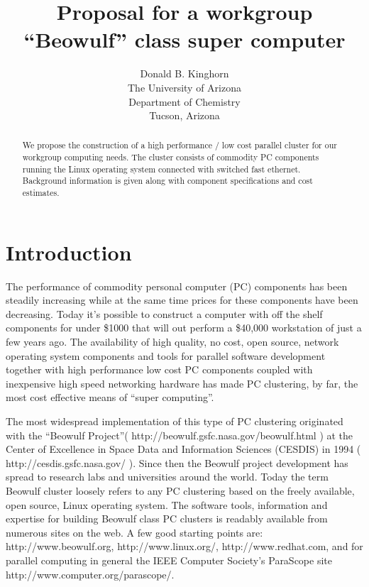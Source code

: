 \documentclass{article}
\begin{document}
\title{Proposal for a workgroup ``Beowulf'' class super computer}
\author{Donald B. Kinghorn\\The University of Arizona\\Department of Chemistry \\Tucson, Arizona}
\maketitle
\begin{abstract}
We propose the construction of a high performance / low cost parallel cluster
for our workgroup computing needs. The cluster consists of commodity PC
components running the Linux operating system connected with switched fast
ethernet. Background information is given along with component specifications
and cost estimates.
\end{abstract}



\section{Introduction}

The performance of commodity personal computer (PC) components has been
steadily increasing while at the same time prices for these components have
been decreasing. Today it's possible to construct a computer with off the
shelf components for under \$1000 that will out perform a \$40,000 workstation
of just a few years ago. The availability of high quality, no cost, open
source, network operating system components and tools for parallel software
development together with high performance low cost PC components coupled with
inexpensive high speed networking hardware has made PC clustering, by far, the
most cost effective means of ``super computing''.

The most widespread implementation of this type of PC clustering originated
with the ``Beowulf Project''( http://beowulf.gsfc.nasa.gov/beowulf.html ) at
the Center of Excellence in Space Data and Information Sciences (CESDIS) in
1994 ( http://cesdis.gsfc.nasa.gov/ ). Since then the Beowulf project
development has spread to research labs and universities around the world.
Today the term Beowulf cluster loosely refers to any PC clustering based on
the freely available, open source, Linux operating system. The software tools,
information and expertise for building Beowulf class PC clusters is readably
available from numerous sites on the web. A few good starting points are:
http://www.beowulf.org, http://www.linux.org/, http://www.redhat.com, and for
parallel computing in general the IEEE Computer Society's ParaScope site http://www.computer.org/parascope/.
\end{document}
